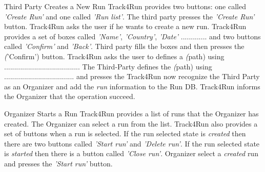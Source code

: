 \documentclass[a4paper]{article}
\begin{document}
        \begin{usecase}{Third Party Creates a New Run}
              {Track4Run provides two buttons: one called \textit{'Create Run'} and one called \textit{'Run list'}.}
              {The third party presses the \textit{'Create Run'} button.}
              {Track4Run asks the user if he wants to create a new run. Track4Run provides a set of boxes called \textit{'Name'}, \textit{'Country'}, \textit{'Date'} ............. and two buttons called \textit{'Confirm'} and \textit{'Back'}.}
              {Third party fills the boxes and then presses the \textit('Confirm') button.}
              {Track4Run asks the user to defines a \textit(path) using ......................................}
              {The Third-Party defines the \textit(path) using ................................... and presses the }
              {Track4Run now recognize the Third Party as an Organizer and add the \textit{run} information to the Run DB.}
              {Track4Run informs the Organizer that the operation succeed.}
        \end{usecase}
        
        \begin{usecase}{Organizer Starts a Run}
              {Track4Run provides a list of runs that the Organizer has created. The Organizer can select a run from the list. Track4Run also provides a set of buttons when a run is selected. If the run selected state is \textit{created} then there are two buttons called \textit{'Start run'} and \textit{'Delete run'}. If the run selected state is \textit{started} then there is a button called \textit{'Close run'}.}
              {Organizer select a \textit{created} run and presses the \textit{'Start run'} button.}
        \end{usecase}
        
\end{document}
